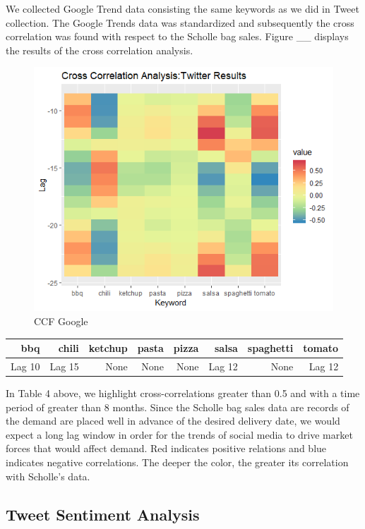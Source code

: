 \documentclass[12pt,oneside]{chicagocapstone}
\begin{document}
We collected Google Trend data consisting the same keywords as we did in
Tweet collection. The Google Trends data was standardized and
subsequently the cross correlation was found with respect to the Scholle
bag sales. Figure \_\_ displays the results of the cross correlation
analysis.
\begin{figure}
\centering
\includegraphics{./figure/CCF_Results_Google.png}
\caption{CCF Google}
\end{figure}
\begin{longtable}[]{@{}rrrrrrrr@{}}
\toprule
bbq & chili & ketchup & pasta & pizza & salsa & spaghetti &
tomato\tabularnewline
\midrule
\endhead
Lag 10 & Lag 15 & None & None & None & Lag 12 & None & Lag
12\tabularnewline
\bottomrule
\end{longtable}
In Table 4 above, we highlight cross-correlations greater than 0.5 and
with a time period of greater than 8 months. Since the Scholle bag sales
data are records of the demand are placed well in advance of the desired
delivery date, we would expect a long lag window in order for the trends
of social media to drive market forces that would affect demand. Red
indicates positive relations and blue indicates negative correlations.
The deeper the color, the greater its correlation with Scholle's data.

\subsection*{Tweet Sentiment Analysis}\label{tweet-sentiment-analysis}
\end{document}
